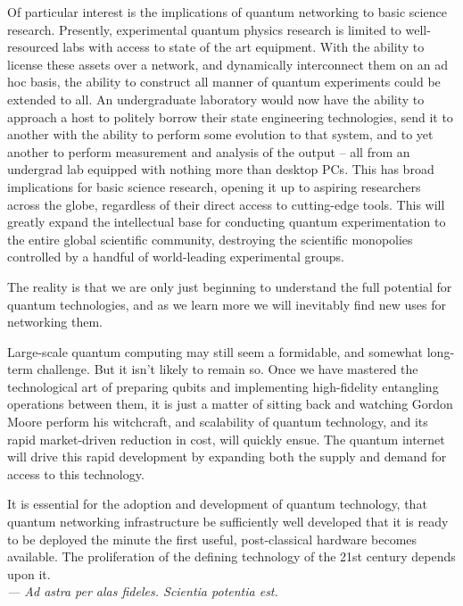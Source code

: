 \documentclass[aps, rmp, twocolumn, amsmath, amssymb, nofootinbib, superscriptaddress, longbibliography, floatfix, table-of-contents, eqsecnum]{revtex4-1}
\begin{document}
Of particular interest is the implications of quantum networking to basic science research. Presently, experimental quantum physics research is limited to well-resourced labs with access to state of the art equipment. With the ability to license these assets over a network, and dynamically interconnect them on an ad hoc basis, the ability to construct all manner of quantum experiments could be extended to all. An undergraduate laboratory would now have the ability to approach a host to politely borrow their state engineering technologies, send it to another with the ability to perform some evolution to that system, and to yet another to perform measurement and analysis of the output -- all from an undergrad lab equipped with nothing more than desktop PCs. This has broad implications for basic science research, opening it up to aspiring researchers across the globe, regardless of their direct access to cutting-edge tools. This will greatly expand the intellectual base for conducting quantum experimentation to the entire global scientific community, destroying the scientific monopolies controlled by a handful of world-leading experimental groups.

The reality is that we are only just beginning to understand the full potential for quantum technologies, and as we learn more we will inevitably find new uses for networking them.

Large-scale quantum computing may still seem a formidable, and somewhat long-term challenge. But it isn't likely to remain so. Once we have mastered the technological art of preparing qubits and implementing high-fidelity entangling operations between them, it is just a matter of sitting back and watching Gordon Moore perform his witchcraft, and scalability of quantum technology, and its rapid market-driven reduction in cost, will quickly ensue. The quantum internet will drive this rapid development by expanding both the supply and demand for access to this technology.

It is essential for the adoption and development of quantum technology, that quantum networking infrastructure be sufficiently well developed that it is ready to be deployed the minute the first useful, post-classical hardware becomes available. The proliferation of the defining technology of the 21st century depends upon it.
\\

\textit{--- Ad astra per alas fideles. Scientia potentia est.}

%
%
\end{document}
